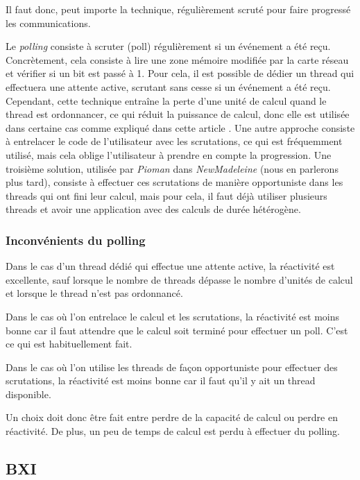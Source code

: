 Il faut donc, peut importe la technique, régulièrement scruté pour faire progressé les communications.


Le \emph{polling} consiste à scruter (poll) régulièrement si un événement a été reçu.
Concrètement, cela consiste à lire une zone mémoire modifiée par la carte réseau et vérifier si un bit est passé à 1.
Pour cela, il est possible de dédier un thread qui effectuera une attente active, scrutant sans cesse si un événement a été reçu.
Cependant, cette technique entraîne la perte d'une unité de calcul quand le thread est ordonnancer, ce qui réduit la puissance de calcul, donc elle est utilisée dans certaine cas comme expliqué dans cette article \cite{denis:hal-03695835}.
Une autre approche consiste à entrelacer le code de l'utilisateur avec les scrutations, ce qui est fréquemment utilisé, mais cela oblige l'utilisateur à prendre en compte la progression.
Une troisième solution, utilisée par \emph{Pioman} dans \emph{NewMadeleine} (nous en parlerons plus tard), consiste à effectuer ces scrutations de manière opportuniste dans les threads qui ont fini leur calcul, mais pour cela, il faut déjà utiliser plusieurs threads et avoir une application avec des calculs de durée hétérogène.

\subsubsection{Inconvénients du polling}


Dans le cas d'un thread dédié qui effectue une attente active, la réactivité est excellente, sauf lorsque le nombre de threads dépasse le nombre d'unités de calcul et lorsque le thread n'est pas ordonnancé.

Dans le cas où l'on entrelace le calcul et les scrutations, la réactivité est moins bonne car il faut attendre que le calcul soit terminé pour effectuer un poll.
C'est ce qui est habituellement fait.

Dans le cas où l'on utilise les threads de façon opportuniste pour effectuer des scrutations, la réactivité est moins bonne car il faut qu'il y ait un thread disponible.

Un choix doit donc être fait entre perdre de la capacité de calcul ou perdre en réactivité.
De plus, un peu de temps de calcul est perdu à effectuer du polling.

\subsection{BXI}

